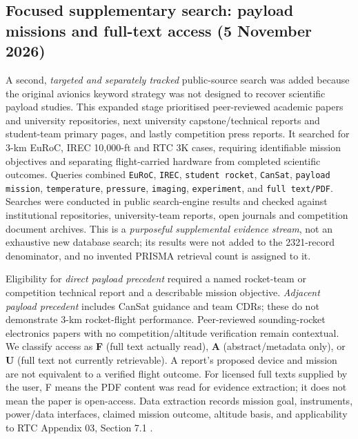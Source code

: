 \documentclass[10pt,a4paper]{article}
\begin{document}
\subsection{Focused supplementary search: payload missions and full-text access (5 November 2026)}
A second, \emph{targeted and separately tracked} public-source search was added because the original avionics keyword strategy was not designed to recover scientific payload studies. This expanded stage prioritised peer-reviewed academic papers and university repositories, next university capstone/technical reports and student-team primary pages, and lastly competition press reports. It searched for 3-km EuRoC, IREC 10,000-ft and RTC 3K cases, requiring identifiable mission objectives and separating flight-carried hardware from completed scientific outcomes. Queries combined \texttt{EuRoC}, \texttt{IREC}, \texttt{student rocket}, \texttt{CanSat}, \texttt{payload mission}, \texttt{temperature}, \texttt{pressure}, \texttt{imaging}, \texttt{experiment}, and \texttt{full text/PDF}. Searches were conducted in public search-engine results and checked against institutional repositories, university-team reports, open journals and competition document archives. This is a \emph{purposeful supplemental evidence stream}, not an exhaustive new database search; its results were not added to the 2321-record denominator, and no invented PRISMA retrieval count is assigned to it.

Eligibility for \emph{direct payload precedent} required a named rocket-team or competition technical report and a describable mission objective. \emph{Adjacent payload precedent} includes CanSat guidance and team CDRs; these do not demonstrate 3-km rocket-flight performance. Peer-reviewed sounding-rocket electronics papers with no competition/altitude verification remain contextual. We classify access as \textbf{F} (full text actually read), \textbf{A} (abstract/metadata only), or \textbf{U} (full text not currently retrievable). A report's proposed device and mission are not equivalent to a verified flight outcome. For licensed full texts supplied by the user, F means the PDF content was read for evidence extraction; it does not mean the paper is open-access. Data extraction records mission goal, instruments, power/data interfaces, claimed mission outcome, altitude basis, and applicability to RTC Appendix 03, Section 7.1 \cite{rtc2027rules}.
\end{document}
